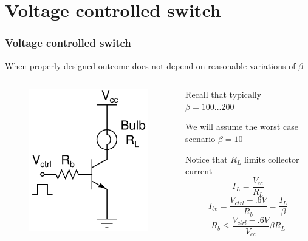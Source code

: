 \documentclass[beamer]{standalone}
\begin{document}
\section{Voltage controlled switch} 
\begin{frame}
\frametitle{Voltage controlled switch}
 When properly designed outcome does not depend on reasonable variations
 of $\beta$
 \begin{columns}[c]
  \begin{column}{.3\textwidth}
   \begin{figure}
    \includegraphics[height=0.40\textheight]{./schematics/npn_switch.pdf}
   \end{figure}

  \end{column}
  \begin{column}{.70\textwidth}
   Recall that typically $\beta = 100 \ldots 200$

   We will assume the worst case scenario \alert{$\beta=10$}

   Notice that $R_L$ limits collector current
   \[ I_L = \frac{V_{cc}}{R_L} \]
   \begin{equation*}
    I_{be} = \frac{V_{ctrl}-.6V}{R_{b}} =  \frac{I_L}{\beta} 
   \end{equation*}
   \begin{equation*}
    R_b \le \frac{V_{ctrl}-.6V} {V_{cc}} \beta R_L
   \end{equation*}

  \end{column}
 \end{columns}
\end{frame}
 
\end{document}
